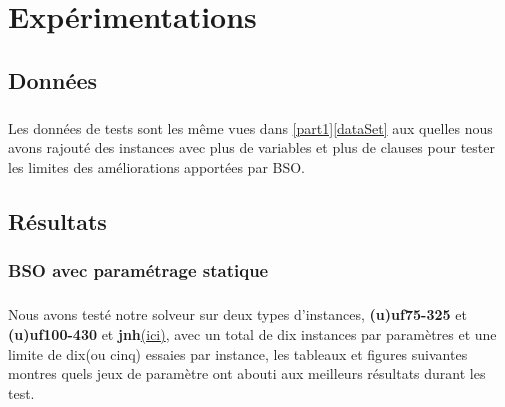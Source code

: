 \chapter{Expérimentations}
	\section{Données}
	\paragraph{}
	Les données de tests sont les même vues dans \ref{part1}\ref{dataSet} aux quelles nous avons rajouté des instances avec plus de variables et plus de clauses pour tester les limites des améliorations apportées par BSO.
	\section{Résultats}
	\subsection{BSO avec paramétrage statique }
	\paragraph{}\label{testconds}
	Nous avons testé notre solveur sur deux types d'instances, \textbf{(u)uf75-325} et \textbf{(u)uf100-430} et \textbf{jnh}\href{http://www.cs.ubc.ca/~hoos/SATLIB/Benchmarks/SAT/DIMACS/JNH/descr.html}{(ici)}, avec un total de dix instances par paramètres et une limite de dix(ou cinq) essaies par instance, les tableaux et figures suivantes montres quels jeux de paramètre ont abouti aux meilleurs résultats durant les test.
		\begin{table}[H]
			\caption{Meilleures combinaisons des paramètres empiriques pour les instances uf75-325}
			\label{BSO_bestUF}
		\end{table}
	\newpage
